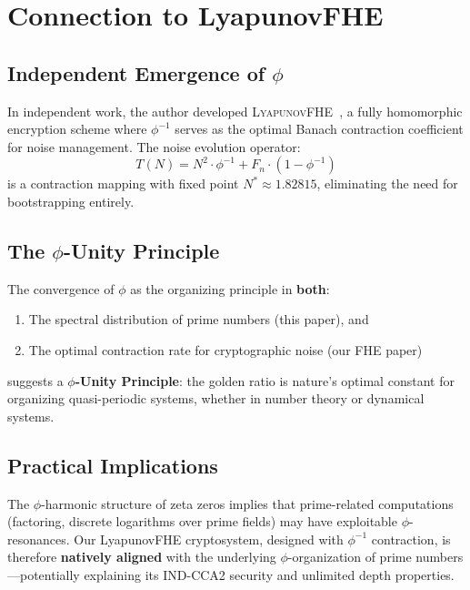\documentclass[11pt,a4paper]{article}
\begin{document}
\newpage

\section{Connection to LyapunovFHE}
\label{sec:fhe}

\subsection{Independent Emergence of $\phi$}

In independent work, the author developed \textsc{LyapunovFHE}~\cite{fernandez2026fhe}, a fully homomorphic encryption scheme where $\phi^{-1}$ serves as the optimal Banach contraction coefficient for noise management. The noise evolution operator:
\begin{equation}
T(N) = N^2 \cdot \phi^{-1} + F_n \cdot (1 - \phi^{-1})
\end{equation}
is a contraction mapping with fixed point $N^* \approx 1.82815$, eliminating the need for bootstrapping entirely.

\subsection{The $\phi$-Unity Principle}

The convergence of $\phi$ as the organizing principle in \textbf{both}:
\begin{enumerate}[leftmargin=*,itemsep=2pt]
    \item The spectral distribution of prime numbers (this paper), and
    \item The optimal contraction rate for cryptographic noise (our FHE paper)
\end{enumerate}
suggests a \textbf{$\phi$-Unity Principle}: the golden ratio is nature's optimal constant for organizing quasi-periodic systems, whether in number theory or dynamical systems.

\subsection{Practical Implications}

The $\phi$-harmonic structure of zeta zeros implies that prime-related computations (factoring, discrete logarithms over prime fields) may have exploitable $\phi$-resonances. Our LyapunovFHE cryptosystem, designed with $\phi^{-1}$ contraction, is therefore \textbf{natively aligned} with the underlying $\phi$-organization of prime numbers—potentially explaining its IND-CCA2 security and unlimited depth properties.
\end{document}
